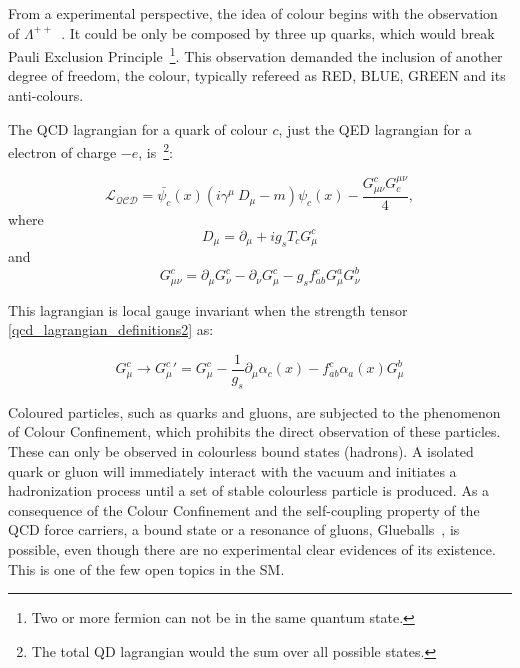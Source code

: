 From a experimental perspective, the idea of colour begins with the observation of $\Lambda^{++}$~\cite{dalitz1967proceedings}. It could be only be composed by three up quarks, which would break Pauli Exclusion Principle~\footnote{Two or more fermion can not be in the same quantum state.}. This observation demanded the inclusion of another degree of freedom, the colour, typically refereed as RED, BLUE, GREEN and its anti-colours.

The QCD lagrangian for a quark of colour $c$, just the QED lagrangian for a electron of charge $-e$, is~\footnote{The total QD lagrangian would the sum over all possible states.}:

\begin{equation}
    \mathcal{L_{QCD}} = \bar{\psi_c}(x)(i\gamma^\mu\ D_\mu -m)\psi_c(x) - \frac{G_{\mu\nu}^c G^{\mu\nu}_c}{4},
\label{qcd_lagrangian}
\end{equation}
where
\begin{equation}
    D_\mu = \partial_\mu + ig_s T_c G_\mu^c
\label{qcd_lagrangian_definitions1}
\end{equation}
and 
\begin{equation}
    G_{\mu\nu}^c = \partial_\mu G_\nu^c - \partial_\nu G_\mu^c - g_s f_{ab}^c G_\mu^a G_\nu^b
\label{qcd_lagrangian_definitions2}
\end{equation}

This lagrangian is local gauge invariant when the strength tensor \ref{qcd_lagrangian_definitions2} as:

\begin{equation}
    G_{\mu}^c \rightarrow {G_{\mu}^c}' = G_{\mu}^c - \frac{1}{g_s} \partial_\mu \alpha_c(x) - f_{ab}^c \alpha_a(x) G_{\mu}^b
\label{strength_tensor_tranform}
\end{equation}

Coloured particles, such as quarks and gluons, are subjected to the phenomenon of Colour Confinement, which prohibits the direct observation of these particles. These can only be observed in colourless bound states (hadrons). A isolated quark or gluon will immediately interact with the vacuum and initiates a hadronization process until a set of stable colourless particle is produced. As a consequence of the Colour Confinement and the self-coupling property of the QCD force carriers, a bound state or a resonance of gluons, Glueballs~\cite{wolfgang_status}, is possible, even though there are no experimental clear evidences of its existence. This is one of the few open topics in the SM.

